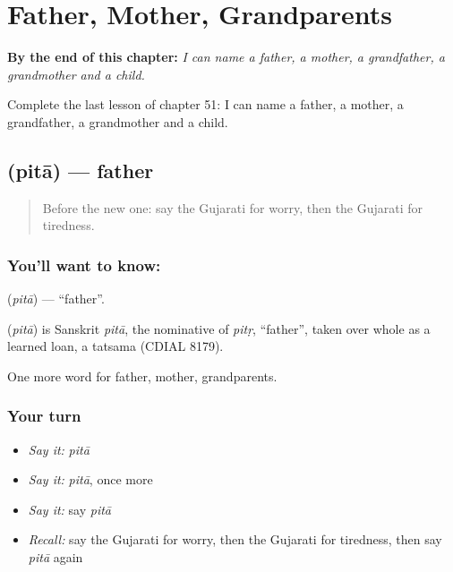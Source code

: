 
\chapter{Father, Mother, Grandparents}
\label{ch:gu-father-mother-grandparents}

\begin{chapteropening}
\textbf{By the end of this chapter:} \emph{I can name a father, a mother, a grandfather, a grandmother and a child.}

Complete the last lesson of chapter 51: I can name a father, a mother, a grandfather, a grandmother and a child.
\end{chapteropening}

\section[\texorpdfstring{\gu{પિતા} (pitā)}{પિતા (pitā)}]{ (pitā) — father}

\label{lesson:GU-C51-father}



\begin{quote}
Before the new one: say the Gujarati for worry, then the Gujarati for tiredness.
\end{quote}

\subsection*{You'll want to know: }
\textbf{} (\emph{pitā}) — \textquotedblleft{}father\textquotedblright{}.

\begin{cousinweb}
\textbf{} (\emph{pitā}) is Sanskrit \emph{pitā}, the nominative of \emph{pitṛ}, \textquotedblleft{}father\textquotedblright{}, taken over whole as a learned loan, a tatsama (CDIAL 8179).
\end{cousinweb}

\begin{grammarlens}[title={What you've built}]
One more word for father, mother, grandparents.
\end{grammarlens}

\subsection*{Your turn}
\begin{itemize}
\raggedright
  \item \emph{Say it:} \emph{pitā}
  \item \emph{Say it:} \emph{pitā}, once more
  \item \emph{Say it:} say \emph{pitā}
  \item \emph{Recall:} say the Gujarati for worry, then the Gujarati for tiredness, then say \emph{pitā} again
\end{itemize}

